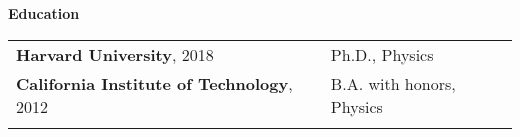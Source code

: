 \documentclass[letterpaper,11pt,oneside]{article}
\newcommand{\crimson}[1]{\textcolor[rgb]{0.67, 0.11, 0.188}{#1}}
\begin{document}
 \vspace{0.5cm}
\raggedright
\normalsize
\begin{flushleft}
 \textbf{\Large{\crimson{E}ducation}} \sout{\hfill} \\
\vspace{0.5cm}
\begin{tabular}{@{} l l }
     \textbf{Harvard University}, 2018 & Ph.D., Physics\\
     \textbf{California Institute of Technology}, 2012 &  B.A. with honors, Physics \\
     \hspace{0.72\linewidth} & \hspace{0.25\linewidth} \\
\end{tabular}
\end{flushleft}




\clearpage
\end{document}

